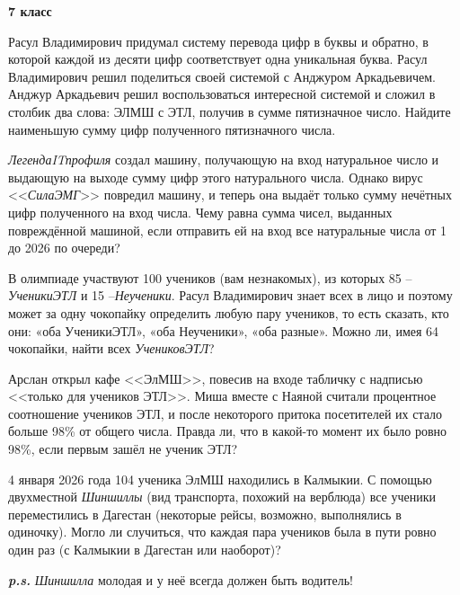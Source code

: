 \hspace{3mm}

\centerline{\bf \Huge 7 класс}

Расул Владимирович придумал систему перевода цифр в буквы и обратно, в которой каждой из десяти цифр соответствует одна уникальная буква. Расул Владимирович решил поделиться своей системой с Анджуром Аркадьевичем. Анджур Аркадьевич решил воспользоваться интересной системой и сложил в столбик два слова: ЭЛМШ с ЭТЛ, получив в сумме пятизначное число. Найдите наименьшую сумму цифр полученного пятизначного числа.

\textit{ЛегендаITпрофиля} создал машину, получающую на вход натуральное число и выдающую на выходе сумму цифр этого натурального числа. Однако вирус <<\textit{СилаЭМГ}>> повредил машину, и теперь она выдаёт только сумму нечётных цифр полученного на вход числа. Чему равна сумма чисел, выданных повреждённой машиной, если отправить ей на вход все натуральные числа от 1 до 2026 по очереди?

В олимпиаде участвуют 100 учеников (вам незнакомых), из которых 85 – \textit{УченикиЭТЛ} и 15 –\textit{Неученики}. Расул Владимирович знает всех в лицо и поэтому может за одну чокопайку определить любую пару учеников, то есть сказать, кто они: «оба УченикиЭТЛ», «оба Неученики», «оба разные». Можно ли, имея 64 чокопайки, найти всех \textit{УчениковЭТЛ}?

Арслан открыл кафе <<ЭлМШ>>, повесив на входе табличку с надписью <<только для учеников ЭТЛ>>. Миша вместе с Наяной считали процентное соотношение учеников ЭТЛ, и после некоторого притока посетителей их стало больше 98\% от общего числа. Правда ли, что в какой-то момент их было ровно 98\%, если первым зашёл не ученик ЭТЛ?

4 января 2026 года 104 ученика ЭлМШ находились в Калмыкии. С помощью двухместной \textit{Шиншиллы} (вид транспорта, похожий на верблюда) все ученики переместились в Дагестан (некоторые рейсы, возможно, выполнялись в одиночку). 
Могло ли случиться, что каждая пара учеников была в пути ровно один раз (с Калмыкии в Дагестан или наоборот)?

\textbf{\textit{p.s.}} \textit{Шиншилла} молодая и у неё всегда должен быть водитель!

